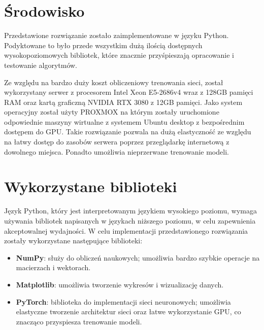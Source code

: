 \section*{Środowisko}
Przedstawione rozwiązanie zostało zaimplementowane w języku Python. Podyktowane to było przede wszystkim dużą ilością dostępnych wysokopoziomowych bibliotek, które znacznie przyśpieszają opracowanie i testowanie algorytmów.

Ze względu na bardzo duży koszt obliczeniowy trenowania sieci, został wykorzystany serwer z procesorem Intel Xeon E5-2686v4 wraz z 128GB pamięci RAM oraz kartą graficzną NVIDIA RTX 3080 z 12GB pamięci. Jako system operacyjny został użyty PROXMOX na którym zostały uruchomione odpowiednie maszyny wirtualne z systemem Ubuntu desktop z bezpośrednim dostępem do GPU. Takie rozwiązanie pozwala na dużą elastyczność ze względu na łatwy dostęp do zasobów serwera poprzez przeglądarkę internetową z dowolnego miejsca. Ponadto umożliwia nieprzerwane trenowanie modeli.

\section*{Wykorzystane biblioteki}
Język Python, który jest interpretowanym językiem wysokiego poziomu, wymaga używania bibliotek napisanych w językach niższego poziomu, w celu zapewnienia akceptowalnej wydajności.
W celu implementacji przedstawionego rozwiązania zostały wykorzystane następujące biblioteki:

\begin{itemize}
	\item \textbf{NumPy}: służy do obliczeń naukowych; umożliwia bardzo szybkie operacje na macierzach i wektorach.
	\item \textbf{Matplotlib}: umożliwia tworzenie wykresów i wizualizację danych.
	\item \textbf{PyTorch}: biblioteka do implementacji sieci neuronowych; umożliwia elastyczne tworzenie architektur sieci oraz łatwe wykorzystanie GPU, co znacząco przyspiesza trenowanie modeli.
\end{itemize}
